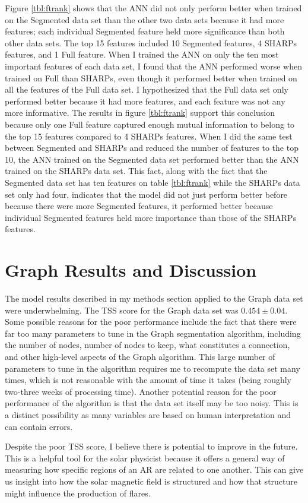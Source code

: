 Figure \ref{tbl:ftrank} shows that the ANN did not only perform better when trained on the Segmented data set than the other two data sets because it had more features; each individual Segmented feature held more significance than both other data sets. The top 15 features included 10 Segmented features, 4 SHARPs features, and 1 Full feature. When I trained the ANN on only the ten most important features of each data set, I found that the ANN performed worse when trained on Full than SHARPs, even though it performed better when trained on all the features of the Full data set. I hypothesized that the Full data set only performed better because it had more features, and each feature was not any more informative. The results in figure \ref{tbl:ftrank} support this conclusion because only one Full feature captured enough mutual information to belong to the top 15 features compared to 4 SHARPs features. When I did the same test between Segmented and SHARPs and reduced the number of features to the top 10, the ANN trained on the Segmented data set performed better than the ANN trained on the SHARPs data set. This fact, along with the fact that the Segmented data set has ten features on table \ref{tbl:ftrank} while the SHARPs data set only had four, indicates that the model did not just perform better before because there were more Segmented features, it performed better because individual Segmented features held more importance than those of the SHARPs features. 


\section{Graph Results and Discussion}

The model results described in my methods section applied to the Graph data set were underwhelming. The TSS score for the Graph data set was $0.454 \pm 0.04$. Some possible reasons for the poor performance include the fact that there were far too many parameters to tune in the Graph segmentation algorithm, including the number of nodes, number of nodes to keep, what constitutes a connection, and other high-level aspects of the Graph algorithm. This large number of parameters to tune in the algorithm requires me to recompute the data set many times, which is not reasonable with the amount of time it takes (being roughly two-three weeks of processing time). Another potential reason for the poor performance of the algorithm is that the data set itself may be too noisy. This is a distinct possibility as many variables are based on human interpretation and can contain errors. 

Despite the poor TSS score, I believe there is potential to improve in the future. This is a helpful tool for the solar physicist because it offers a general way of measuring how specific regions of an AR are related to one another. This can give us insight into how the solar magnetic field is structured and how that structure might influence the production of flares. 
